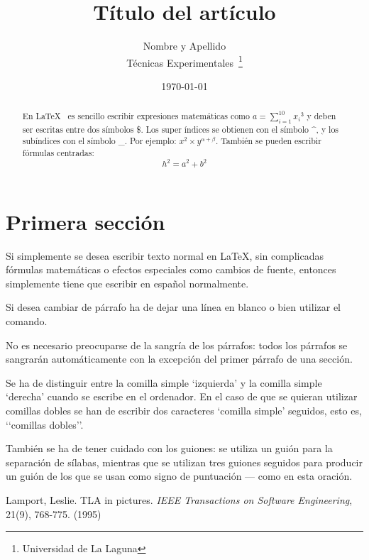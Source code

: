\documentclass[a4paper,12pt]{article}
\begin{document}
\title{Título del artículo}
\author{Nombre y Apellido \\
         Técnicas Experimentales~\footnote{Universidad de La Laguna}
       }
\date{\today}
\maketitle
\begin{abstract}
 En \LaTeX{}~\cite{Lam:86} es sencillo escribir expresiones
 matemáticas como $a=\sum_{i=1}^{10} {x_i}^{3}$
 y deben ser escritas entre dos símbolos \$.
 Los super índices se obtienen con el símbolo \^{}, y
 los subíndices con el símbolo \_.
 Por ejemplo: $x^2 \times y^{\alpha + \beta}$.
 También se pueden escribir fórmulas centradas:
 \[h^2=a^2 + b^2 \]
\end{abstract}

\section{Primera sección}
 Si simplemente se desea escribir texto normal en LaTeX,
 sin complicadas f\'ormulas matem\'aticas o efectos especiales
 como cambios de fuente, entonces simplemente tiene que escribir
 en espa\~nol normalmente.\par
 Si desea cambiar de párrafo ha de dejar una línea en blanco o bien
 utilizar el comando.\par
 No es necesario preocuparse de la sangría de los párrafos:
 todos los párrafos se sangrarán automáticamente con la excepción
 del primer párrafo de una sección.

 Se ha de distinguir entre la comilla simple ‘izquierda’
 y la comilla simple ‘derecha’ cuando se escribe en el ordenador.
 En el caso de que se quieran utilizar comillas dobles se han de
 escribir dos caracteres ‘comilla simple’ seguidos, esto es,
 ‘‘comillas dobles’’.

 También se ha de tener cuidado con los guiones: se utiliza un 
 guión para la separación de sílabas, mientras que se utilizan
 tres guiones seguidos para producir un guión de los que se usan
como signo de puntuación --- como en esta oración.
\begin{thebibliography}{00}
  Lamport, Leslie.
  TLA in pictures.
  \emph{IEEE Transactions on Software Engineering},
  21(9), 768-775.
  (1995)
\end{thebibliography}
\end{document}
